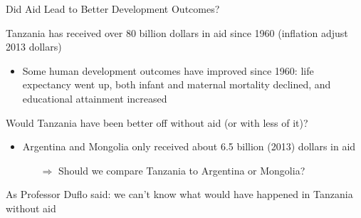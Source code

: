 \documentclass[10pt,xcolor=table,ignorenonframetext,handout,aspectratio=169]{beamer}
\newlength{\wideitemsep}
\let\olditem\item
\renewcommand{\item}{\setlength{\itemsep}{\wideitemsep}\olditem}
\begin{document}
\begin{frame}{Did Aid Lead to Better Development Outcomes?}

\medskip
		Tanzania has received over 80 billion dollars in aid since 1960 (inflation adjust 2013 dollars)
	
\medskip
\begin{itemize}
		
		\item Some human development outcomes have improved since 1960:  life expectancy went up, both infant and maternal mortality declined, and educational attainment increased
		
\end{itemize}

\pause 
\medskip
\medskip
Would Tanzania have been better off without aid (or with less of it)?

\medskip
\begin{itemize}
	
	\item Argentina and Mongolia only received about 6.5 billion (2013) dollars in aid
	
	\medskip
	\begin{itemize}
		
		\item[$\Rightarrow$] Should we compare Tanzania to Argentina or Mongolia?
		
	\end{itemize}
	
\end{itemize}

\pause 
\medskip
\medskip
As Professor Duflo said:  we can't know what would have happened in Tanzania without aid


\end{frame}


\end{document}
